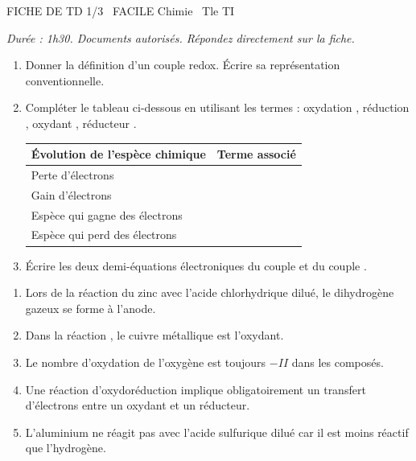 \documentclass[11pt]{article}
\begin{document}
\begin{tcolorbox}[enhanced,colback=popink,colframe=popink,arc=10pt,boxrule=0pt,left=12pt,right=12pt,top=9pt,bottom=9pt]
{\color{white}\popxbold\small FICHE DE TD 1/3 \textbullet\ FACILE \hfill Chimie \textbullet\ Tle TI\par}
\end{tcolorbox}
\vspace{4pt}
\emph{Durée : 1h30. Documents autorisés. Répondez directement sur la fiche.}

\begin{exercice}
\begin{enumerate}
    \item Donner la définition d'un couple redox. Écrire sa représentation conventionnelle.
    \item Compléter le tableau ci-dessous en utilisant les termes : \og oxydation \fg{}, \og réduction \fg{}, \og oxydant \fg{}, \og réducteur \fg{}.
    \begin{center}
    \begin{tabular}{|l|c|}
    \hline
    \textbf{Évolution de l'espèce chimique} & \textbf{Terme associé} \\
    \hline
    Perte d'électrons & \\
    \hline
    Gain d'électrons & \\
    \hline
    Espèce qui gagne des électrons & \\
    \hline
    Espèce qui perd des électrons & \\
    \hline
    \end{tabular}
    \end{center}
    \item Écrire les deux demi-équations électroniques du couple  et du couple .
\end{enumerate}
\end{exercice}

\begin{exercice}
\begin{enumerate}
    \item Lors de la réaction du zinc avec l'acide chlorhydrique dilué, le dihydrogène gazeux se forme à l'anode.
    \item Dans la réaction , le cuivre métallique est l'oxydant.
    \item Le nombre d'oxydation de l'oxygène est toujours $-II$ dans les composés.
    \item Une réaction d'oxydoréduction implique obligatoirement un transfert d'électrons entre un oxydant et un réducteur.
    \item L'aluminium ne réagit pas avec l'acide sulfurique dilué car il est moins réactif que l'hydrogène.
\end{enumerate}
\end{exercice}
\end{document}
